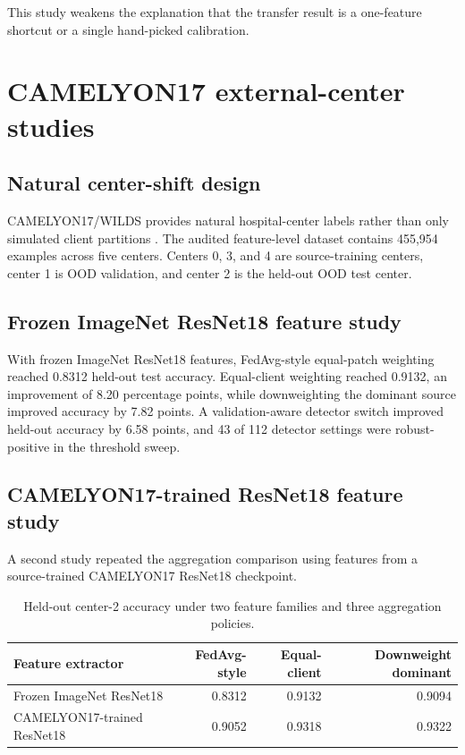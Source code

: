 This study weakens the explanation that the transfer result is a one-feature shortcut or a single hand-picked calibration.

\section{CAMELYON17 external-center studies}

\subsection{Natural center-shift design}
CAMELYON17/WILDS provides natural hospital-center labels rather than only simulated client partitions \citep{bandi2018camelyon17,koh2021wilds}. The audited feature-level dataset contains 455,954 examples across five centers. Centers 0, 3, and 4 are source-training centers, center 1 is OOD validation, and center 2 is the held-out OOD test center.

\subsection{Frozen ImageNet ResNet18 feature study}
With frozen ImageNet ResNet18 features, FedAvg-style equal-patch weighting reached 0.8312 held-out test accuracy. Equal-client weighting reached 0.9132, an improvement of 8.20 percentage points, while downweighting the dominant source improved accuracy by 7.82 points. A validation-aware detector switch improved held-out accuracy by 6.58 points, and 43 of 112 detector settings were robust-positive in the threshold sweep.

\subsection{CAMELYON17-trained ResNet18 feature study}
A second study repeated the aggregation comparison using features from a source-trained CAMELYON17 ResNet18 checkpoint.

\begin{table}[!htbp]
\centering
\caption{Held-out center-2 accuracy under two feature families and three aggregation policies.}
\small
\begin{tabular}{lrrr}
\toprule
Feature extractor & FedAvg-style & Equal-client & Downweight dominant \\
\midrule
Frozen ImageNet ResNet18 & 0.8312 & 0.9132 & 0.9094 \\
CAMELYON17-trained ResNet18 & 0.9052 & 0.9318 & 0.9322 \\
\bottomrule
\end{tabular}
\label{tab:camelyon17_two_feature_studies}
\end{table}
\FloatBarrier


